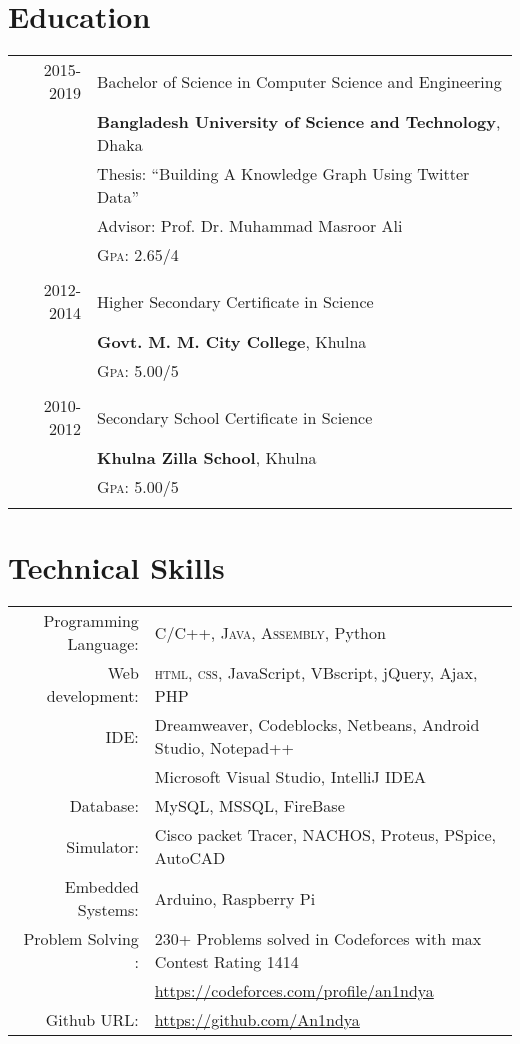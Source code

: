 \documentclass[a4paper,10pt]{article}
\begin{document}
\section{Education}
\begin{tabular}{rl}	


\textsc{} 2015-2019 & Bachelor of Science in Computer Science and Engineering\\ 
& \textbf{Bangladesh University of Science and Technology}, Dhaka\\
& Thesis: ``Building A Knowledge Graph Using Twitter Data'' \\& \small Advisor: Prof. Dr. Muhammad Masroor Ali \\
&\normalsize \textsc{Gpa}: 2.65/4\\&\\

\textsc{} 2012-2014 & Higher Secondary Certificate in  Science \\
& \textbf{Govt. M. M. City College}, Khulna\\
&\normalsize \textsc{Gpa}: 5.00/5\\&\\

\textsc{} 2010-2012 & Secondary School Certificate in  Science \\
& \textbf{Khulna Zilla School}, Khulna\\
&\normalsize \textsc{Gpa}: 5.00/5\\&\\

\end{tabular}
\section{Technical Skills}
\begin{tabular}{rl}
 Programming Language:& \textsc{C/C++}, \textsc{Java}, \textsc{Assembly}, Python\\
Web development:& \textsc{html}, \textsc{css}, JavaScript, VBscript, jQuery, Ajax, PHP\\
IDE:& Dreamweaver, Codeblocks, Netbeans, Android Studio, Notepad++\\
& Microsoft Visual Studio, IntelliJ IDEA\\
Database: & MySQL, MSSQL, FireBase\\
Simulator: & Cisco packet Tracer, NACHOS, Proteus, PSpice, AutoCAD\\
Embedded Systems: & Arduino, Raspberry Pi \\
Problem Solving :& 230+ Problems solved in Codeforces with max Contest Rating 1414\\
& \url{https://codeforces.com/profile/an1ndya}\\
Github URL: & \url{https://github.com/An1ndya}\\
\end{tabular}
\end{document}
